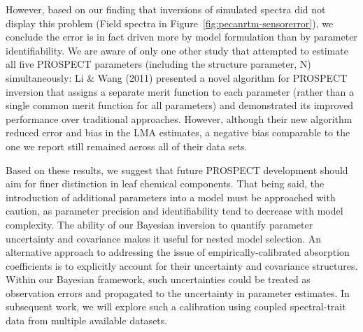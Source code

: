 However, based on our finding that inversions of simulated spectra did not display this problem (Field spectra in Figure~\ref{fig:pecanrtm-sensorerror}), we conclude the error is in fact driven more by model formulation than by parameter identifiability.
We are aware of only one other study that attempted to estimate all five PROSPECT parameters (including the structure parameter, N) simultaneously: \nocite{li_2011_retrieval}
Li \& Wang (2011) presented a novel algorithm for PROSPECT inversion that assigns a separate merit function to each parameter (rather than a single common merit function for all parameters) and demonstrated its improved performance over traditional approaches.
However, although their new algorithm reduced error and bias in the LMA estimates, a negative bias comparable to the one we report still remained across all of their data sets. 

Based on these results, we suggest that future PROSPECT development should aim for finer distinction in leaf chemical components.
That being said, the introduction of additional parameters into a model must be approached with caution, as parameter precision and identifiability tend to decrease with model complexity.
The ability of our Bayesian inversion to quantify parameter uncertainty and covariance makes it useful for nested model selection.
An alternative approach to addressing the issue of empirically-calibrated absorption coefficients is to explicitly account for their uncertainty and covariance structures. 
Within our Bayesian framework, such uncertainties could be treated as observation errors and propagated to the uncertainty in parameter estimates.
In subsequent work, we will explore such a calibration using coupled spectral-trait data from multiple available datasets.

